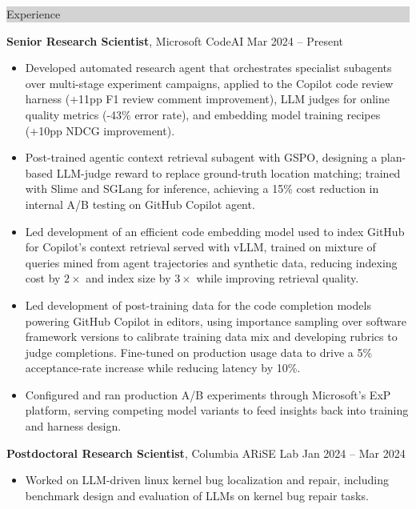\documentclass{article} %
\newcommand{\rsection}[1]{
  \hspace{-0.4cm}\vspace{0.1cm}
\colorbox{lightgrey}{
\begin{minipage}{1.07\linewidth}
\vspace{0.22cm}
\fontsize{14pt}{16pt}\selectfont #1
\vspace{0.12cm}
\end{minipage}
}
\par\nopagebreak %
}
\newcommand{\rjob}[2]{
  \hspace*{-0.3cm}
{\fontsize{10pt}{12pt}\selectfont #1} \hfill #2
\hspace*{-1.2cm}
}
\newenvironment{ritemize}{
\par\nopagebreak %
\vspace{-\parskip}
\hspace*{-0.8cm}
\begin{minipage}{1.05\linewidth}
\fontsize{10pt}{11pt}\selectfont
\vspace{0.1cm}
\begin{itemize}[itemsep=0pt,parsep=0pt,topsep=1pt,partopsep=0pt]
}{
\end{itemize}
\end{minipage}
\vspace{-0.1cm}
}
\newcommand{\ritem}{
\item[-]
}
\begin{document}
\rsection{Experience}

\rjob{\textbf{Senior Research Scientist}, Microsoft CodeAI}{Mar 2024 -- Present}
\begin{ritemize}
    \ritem Developed automated research agent that orchestrates specialist subagents over multi-stage experiment campaigns, applied to the Copilot code review harness (+11pp F1 review comment improvement), LLM judges for online quality metrics (-43\% error rate), and embedding model training recipes (+10pp NDCG improvement).
    \ritem Post-trained agentic context retrieval subagent with GSPO, designing a plan-based LLM-judge reward to replace ground-truth location matching; trained with Slime and SGLang for inference, achieving a 15\% cost reduction in internal A/B testing on GitHub Copilot agent.
    \ritem Led development of an efficient code embedding model used to index GitHub for Copilot's context retrieval served with vLLM, trained on mixture of queries mined from agent trajectories and synthetic data, reducing indexing cost by $2\times$ and index size by $3\times$ while improving retrieval quality. 
    \ritem Led development of post-training data for the code completion models powering GitHub Copilot in editors, using importance sampling over software framework versions to calibrate training data mix and developing rubrics to judge completions. Fine-tuned on production usage data to drive a 5\% acceptance-rate increase while reducing latency by 10\%.
    \ritem Configured and ran production A/B experiments through Microsoft's ExP platform, serving competing model variants to feed insights back into training and harness design.
\end{ritemize}

\rjob{\textbf{Postdoctoral Research Scientist}, Columbia ARiSE Lab}{Jan 2024 -- Mar 2024}
\begin{ritemize}
    \ritem Worked on LLM-driven linux kernel bug localization and repair, including benchmark design and evaluation of LLMs on kernel bug repair tasks. 
\end{ritemize}
\end{document}
